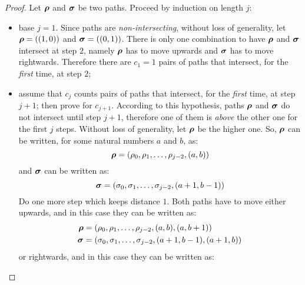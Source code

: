 \begin{proof}
    Let $\boldsymbol{\rho}$ and $\boldsymbol{\sigma}$ be two paths. Proceed by 
    induction on length $j$:
    \begin{itemize}
        \item base $j=1$. Since paths are \emph{non-intersecting}, without loss
            of generality, let $\boldsymbol{\rho}=((1,0))$ and $\boldsymbol{\sigma}=((0,1))$.
            There is only one combination to have $\boldsymbol{\rho}$ and $\boldsymbol{\sigma}$
            intersect at step $2$, namely $\boldsymbol{\rho}$ has to move upwards and
            $\boldsymbol{\sigma}$ has to move rightwards. Therefore there are $c_{1}=1$ pairs
            of paths that intersect, for the \emph{first} time, at step $2$; 
        \item assume that $c_j$ counts pairs of paths that intersect, 
            for the \emph{first} time, at step $j+1$; then prove for $c_{j+1}$. 
            According to this hypothesis, paths $\boldsymbol{\rho}$ and $\boldsymbol{\sigma}$ 
            do not intersect until step $j+1$, therefore one of them is \emph{above}
            the other one for the first $j$ steps. 
            Without loss of generality, let $\boldsymbol{\rho}$ be the higher one. So, 
            $\boldsymbol{\rho}$ can be written, for some natural numbers $a$ and $b$, as:
            \begin{displaymath}
                \boldsymbol{\rho}=(\rho_{0},\rho_{1},\ldots,\rho_{j-2},(a, b))
            \end{displaymath}
            and $\boldsymbol{\sigma}$ can be written as:
            \begin{displaymath}
                \boldsymbol{\sigma}=(\sigma_{0},\sigma_{1},\ldots,\sigma_{j-2},(a+1, b-1))
            \end{displaymath}
            Do one more step which keeps distance $1$. Both paths have to move
            either upwards, and in this case they can be written as:
            \begin{displaymath}
                \begin{split}
                    \boldsymbol{\rho}&=(\rho_{0},\rho_{1},\ldots,\rho_{j-2},(a, b),(a, b+1))\\
                    \boldsymbol{\sigma}&=(\sigma_{0},\sigma_{1},\ldots,\sigma_{j-2},(a+1,b-1), (a+1, b))
                \end{split}
            \end{displaymath}
            or rightwards, and in this case they can be written as:
            \begin{displaymath}

\end{displaymath}
\end{itemize}
\end{proof}
